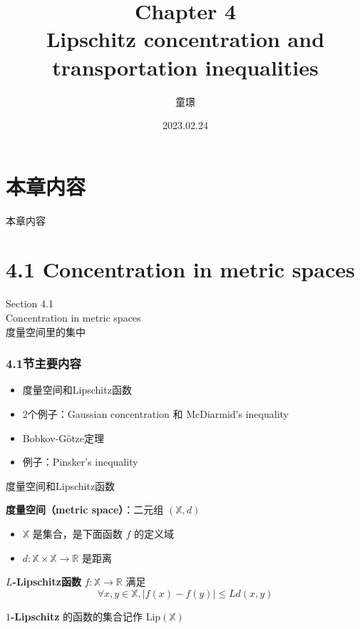 \documentclass{beamer}
\title{Chapter 4 \\ Lipschitz concentration and transportation inequalities}
\author{童璟}
\date{2023.02.24}
\begin{document}
\frame{\titlepage}

\section{本章内容}

\begin{frame}{本章内容}
\tableofcontents
\end{frame}

\section{4.1 Concentration in metric spaces}

\begin{frame}
\begin{center}
\Large Section 4.1 \\ Concentration in metric spaces \\ 度量空间里的集中
\end{center}
\end{frame}

\begin{frame}
\frametitle{4.1节主要内容}
\begin{itemize}
    \item 度量空间和Lipschitz函数
    \item 2个例子：Gaussian concentration 和 McDiarmid's inequality 
    \item Bobkov-G{\" o}tze定理
    \item 例子：Pinsker's inequality
\end{itemize}
\end{frame}

\begin{frame}{度量空间和Lipschitz函数}

\textbf{度量空间（metric space）}：二元组 $(\mathbb{X}, d)$
\begin{itemize}
    \item $\mathbb{X}$ 是集合，是下面函数 $f$ 的定义域
    \item $d: \mathbb{X}\times \mathbb{X} \to \mathbb{R}$ 是距离
\end{itemize}

\quad

\textbf{$L$-Lipschitz函数} $f: \mathbb{X} \to \mathbb{R}$ 满足
$$
\forall x, y \in\mathbb{X}, |f(x) - f(y)| \le L d(x, y)
$$

\textbf{$1$-Lipschitz} 的函数的集合记作 $\text{Lip}(\mathbb{X})$

\end{frame}
\end{document}
